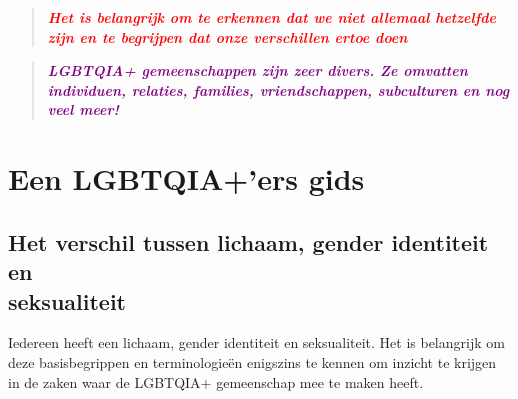 \documentclass[12pt,openany]{book}
\begin{document}
\begin{quote}
\centering
\textit{\Large \textcolor{red}{\textbf{Het is belangrijk om te erkennen dat we niet allemaal hetzelfde zijn en te begrijpen dat onze verschillen ertoe doen}}}
\end{quote}

\newpage
\thispagestyle{empty}
\begin{quote}
\centering
\doublespacing
\textit{\Large \textcolor{purple}{\textbf{LGBTQIA+ gemeenschappen zijn zeer divers. Ze omvatten individuen, relaties, families, vriendschappen, subculturen en nog veel meer!}}}
\end{quote}

\begin{figure}[h]
    \centering
\end{figure}

\chapter*{Een LGBTQIA+'ers gids}

\section*{Het verschil tussen lichaam, gender identiteit en \\ \mbox{seksualiteit}}

Iedereen heeft een lichaam, gender identiteit en seksualiteit. Het is belangrijk om deze basisbegrippen en terminologieën enigszins te kennen om inzicht te krijgen in de zaken waar de LGBTQIA+ gemeenschap mee te maken heeft.
\end{document}
